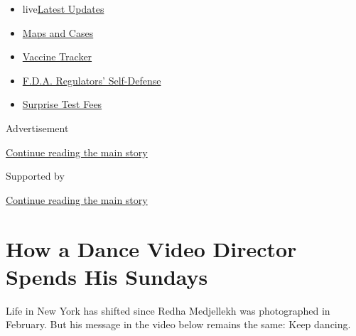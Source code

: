 \begin{itemize}
\tightlist
\item
  live\href{https://www.nytimes3xbfgragh.onion/2020/09/12/world/covid-19-coronavirus.html?name=styln-coronavirus-national\&region=TOP_BANNER\&block=storyline_menu_recirc\&action=click\&pgtype=Article\&impression_id=3e65c861-f52e-11ea-aab9-5d05d5926c06\&variant=undefined}{Latest
  Updates}
\item
  \href{https://www.nytimes3xbfgragh.onion/interactive/2020/us/coronavirus-us-cases.html?name=styln-coronavirus-national\&region=TOP_BANNER\&block=storyline_menu_recirc\&action=click\&pgtype=Article\&impression_id=3e65c862-f52e-11ea-aab9-5d05d5926c06\&variant=undefined}{Maps
  and Cases}
\item
  \href{https://www.nytimes3xbfgragh.onion/interactive/2020/science/coronavirus-vaccine-tracker.html?name=styln-coronavirus-national\&region=TOP_BANNER\&block=storyline_menu_recirc\&action=click\&pgtype=Article\&impression_id=3e65c863-f52e-11ea-aab9-5d05d5926c06\&variant=undefined}{Vaccine
  Tracker}
\item
  \href{https://www.nytimes3xbfgragh.onion/2020/09/10/us/politics/fda-coronavirus-vaccine.html?name=styln-coronavirus-national\&region=TOP_BANNER\&block=storyline_menu_recirc\&action=click\&pgtype=Article\&impression_id=3e65c864-f52e-11ea-aab9-5d05d5926c06\&variant=undefined}{F.D.A.
  Regulators' Self-Defense}
\item
  \href{https://www.nytimes3xbfgragh.onion/2020/09/09/upshot/coronavirus-surprise-test-fees.html?name=styln-coronavirus-national\&region=TOP_BANNER\&block=storyline_menu_recirc\&action=click\&pgtype=Article\&impression_id=3e65c865-f52e-11ea-aab9-5d05d5926c06\&variant=undefined}{Surprise
  Test Fees}
\end{itemize}

Advertisement

\protect\hyperlink{after-top}{Continue reading the main story}

Supported by

\protect\hyperlink{after-sponsor}{Continue reading the main story}

\hypertarget{how-a-dance-video-director-spends-his-sundays}{%
\section{How a Dance Video Director Spends His
Sundays}\label{how-a-dance-video-director-spends-his-sundays}}

Life in New York has shifted since Redha Medjellekh was photographed in
February. But his message in the video below remains the same: Keep
dancing.

